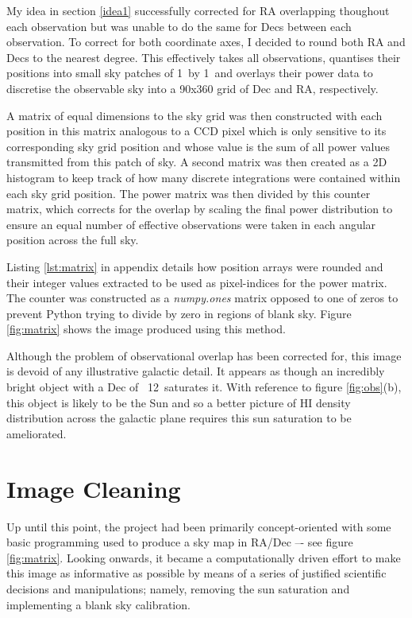 \documentclass[a4paper]{jpconf}
\begin{document}
\begin{multicols}{2}
My idea in section \ref{idea1} successfully corrected for RA overlapping thoughout each observation but was unable to do the same for Decs between each observation. To correct for both coordinate axes, I decided to round both RA and Decs to the nearest degree. This effectively takes all observations, quantises their positions into small sky patches of 1\degree~by 1\degree~and overlays their power data to discretise the observable sky into a 90x360 grid of Dec and RA, respectively. 

A matrix of equal dimensions to the sky grid was then constructed with each position in this matrix analogous to a CCD pixel which is only sensitive to its corresponding sky grid position and whose value is the sum of all power values transmitted from this patch of sky. A second matrix was then created as a 2D histogram to keep track of how many discrete integrations were contained within each sky grid position. The power matrix was then divided by this counter matrix, which corrects for the overlap by scaling the final power distribution to ensure an equal number of effective observations were taken in each angular position across the full sky.

Listing \ref{lst:matrix} in appendix details how position arrays were rounded and their integer values extracted to be used as pixel-indices for the power matrix. The counter was constructed as a \textit{numpy.ones} matrix opposed to one of zeros to prevent Python trying to divide by zero in regions of blank sky. Figure \ref{fig:matrix} shows the image produced using this method.

Although the problem of observational overlap has been corrected for, this image is devoid of any illustrative galactic detail. It appears as though an incredibly bright object with a Dec of ~12\degree~saturates it. With reference to figure \ref{fig:obs}(b), this object is likely to be the Sun and so a better picture of HI density distribution across the galactic plane requires this sun saturation to be ameliorated.

\section{Image Cleaning} \label{cleaning}

Up until this point, the project had been primarily concept-oriented with some basic programming used to produce a sky map in RA/Dec –- see figure \ref{fig:matrix}. Looking onwards, it became a computationally driven effort to make this image as informative as possible by means of a series of justified scientific decisions and manipulations; namely, removing the sun saturation and implementing a blank sky calibration.


\end{multicols}
\end{document}
